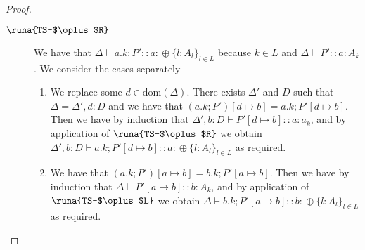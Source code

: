 \begin{lemma}
\begin{proof}
\begin{description}

\item[$\runa{TS-$\oplus$R}$] We have that $\Delta\vdash a.k; P' :: a\!:\!\oplus\{l:A_l\}_{l\in L}$ because $k \in L$ and $\Delta \vdash P' :: a\!:\!A_k$. We consider the cases separately
\begin{enumerate}
    \item We replace some $d\in\text{dom}(\Delta)$. There exists $\Delta'$ and $D$ such that $\Delta=\Delta',d:D$ and we have that $(a.k; P')[d\mapsto b]=a.k; P'[d\mapsto b]$. Then we have by induction that $\Delta',b:D\vdash P'[d\mapsto b] :: a\!:\!a_k$, and by application of $\runa{TS-$\oplus$R}$ we obtain $\Delta',b:D\vdash a.k; P'[d\mapsto b] :: a\!:\!\oplus\{l:A_l\}_{l\in L}$ as required.
    
    \item We have that $(a.k; P')[a\mapsto b]=b.k; P'[a\mapsto b]$. Then we have by induction that $\Delta\vdash P'[a\mapsto b] :: b\!:\!A_k$, and by application of $\runa{TS-$\oplus$L}$ we obtain $\Delta\vdash b.k; P'[a\mapsto b] :: b\!:\!\oplus\{l:A_l\}_{l\in L}$ as required.
\end{enumerate}



\end{description}
\end{proof}
\end{lemma}
